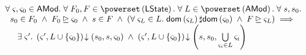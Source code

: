 \newpage	
\begin{lemma}[]\label{lem:amodWitness}
%
\[
\begin{array}{l}
	\for{\amod{}, \amod{0} \in \AMods} \for{F_0, F \in \pset{\LState}} \for{ L \in \pset{\AMods}} \for{s, s_0}\\
	\hspace*{0.2cm} s_0 \in F_0 \;\land\; F_0 \strictfences \amod{0} \;\land\; s \in F \;\land\; \left(\for{\amod{L} \in L}  \dom{\amod{L}} \disjoint \dom{\amod{0}} \;\land\; F \strictfences \amod{L}\right) \implies \\
	\hspace*{0.5cm} \exsts{\amod{}'} 
	 \extendsAM{\amod{}', L \cup \{\amod{0}\}}{s_0}{s}{\amod{0}} \;\land\;
	 \extendsAM{\amod{}', L \cup \{\amod{0}\}}{s}{s_0}{\bigcup\limits_{\amod{i} \in L} \amod{i}}


\end{array}\]
\end{lemma}

